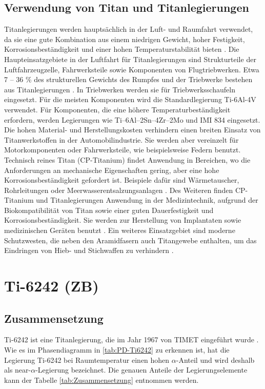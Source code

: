 \subsection{Verwendung von Titan und Titanlegierungen}
Titanlegierungen werden hauptsächlich in der Luft- und Raumfahrt verwendet, da sie eine gute Kombination aus einem niedrigen Gewicht, hoher Festigkeit, Korrosionsbeständigkeit und einer hohen Temperaturstabilität bieten \cite{C.Leyens.2005,R.R.Boyer.1996,M.PetersJ.KumpfertC.WardC.Leyens.2003}. Die Haupteinsatzgebiete in der Luftfahrt für Titanlegierungen sind Strukturteile der Luftfahrzeugzelle, Fahrwerksteile sowie Komponenten von Flugtriebwerken. Etwa 7 -- 36 \% des strukturellen Gewichts des Rumpfes und der Triebwerke bestehen aus Titanlegierungen \cite{Lutjering.2007}. In Triebwerken werden sie für Triebwerksschaufeln eingesetzt. Für die meisten Komponenten wird die Standardlegierung Ti-6Al-4V verwendet. Für Komponenten, die eine höhere Temperaturbeständigkeit erfordern, werden Legierungen wie Ti–6Al–2Sn–4Zr–2Mo und IMI 834 eingesetzt. Die hohen Material- und Herstellungskosten verhindern einen breiten Einsatz von Titanwerkstoffen in der Automobilindustrie. Sie werden aber vereinzelt für Motorkomponenten oder Fahrwerksteile, wie beispielsweise Federn benutzt. Technisch reines Titan (CP-Titanium) findet Anwendung in Bereichen, wo die Anforderungen an mechanische Eigenschaften gering, aber eine hohe Korrosionsbeständigkeit gefordert ist. Beispiele dafür sind Wärmetauscher, Rohrleitungen oder Meerwasserentsalzungsanlagen \cite{A.D.Khawajia.2008}. Des Weiteren finden CP-Titanium und Titanlegierungen Anwendung in der Medizintechnik, aufgrund der Biokompatibilität von Titan sowie einer guten Dauerfestigkeit und Korrosionsbeständigkeit. Sie werden zur Herstellung von Implantaten sowie medizinischen Geräten benutzt \cite{M.GeethaA.K.SinghR.AsokamaniA.K.Gogia.2009}. Ein weiteres Einsatzgebiet sind moderne Schutzwesten, die neben den Aramidfasern auch Titangewebe enthalten, um das Eindringen von Hieb- und Stichwaffen zu verhindern \cite{C.Leyens.2005}.  

\section{Ti-6242 (ZB)}

\subsection{Zusammensetzung}

Ti-6242 ist eine Titanlegierung, die im Jahr 1967 von TIMET eingeführt wurde \cite{ImmanuelFreiherrvonThungen.}. 
Wie es im Phasendiagramm in \ref{tab:PD-Ti6242} zu erkennen ist, hat die Legierung Ti-6242 bei Raumtemperatur einen hohen $\alpha$-Anteil und wird deshalb als near-$\alpha$-Legierung bezeichnet.
Die genauen Anteile der Legierungselemente kann der Tabelle \ref{tab:Zusammensetzung} entnommen werden. 


